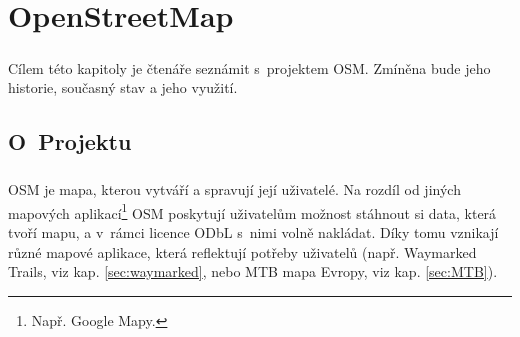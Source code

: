 \documentclass[11pt,a4paper,titlepage,oneside]{book}
\begin{document}
\chapter{OpenStreetMap}

		\paragraph{} Cílem této kapitoly je čtenáře seznámit s~projektem \acl{OSM}. Zmíněna bude jeho historie, současný stav a jeho využití.

	\section{O~Projektu}







        

		\paragraph{} \acl{OSM} je mapa, kterou vytváří a spravují její uživatelé. Na rozdíl od jiných mapových aplikací\footnote{Např. Google Mapy.} \acl{OSM} poskytují uživatelům možnost stáhnout si data, která tvoří mapu, a v~rámci licence \ac{ODbL} s~nimi volně nakládat. Díky tomu vznikají různé mapové aplikace, která reflektují potřeby uživatelů (např. Waymarked Trails, viz kap. \ref{sec:waymarked}, nebo MTB mapa Evropy, viz kap. \ref{sec:MTB}). 
\end{document}
